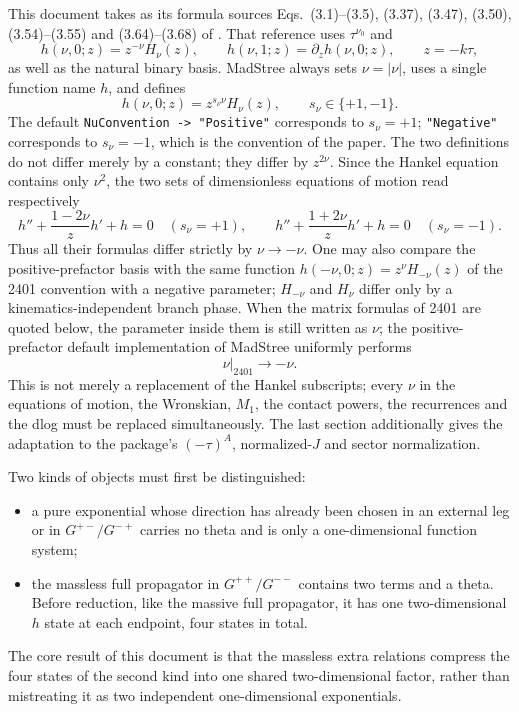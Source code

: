 \documentclass[11pt,a4paper]{article}
\begin{document}
This document takes as its formula sources Eqs.~(3.1)--(3.5), (3.37), (3.47), (3.50), (3.54)--(3.55) and (3.64)--(3.68) of \cite{Chen:2023eic}. That reference uses $\tau^{\nu_0}$ and
\begin{equation}
 h(\nu,0;z)=z^{-\nu}H_{\nu}(z),
 \qquad
 h(\nu,1;z)=\partial_z h(\nu,0;z),
 \qquad z=-k\tau,
 \label{eq:paper-h-definition}
\end{equation}
as well as the natural binary basis. MadStree always sets $\nu=|\nu|$, uses a single function name $h$, and defines
\begin{equation}
 \boxed{h(\nu,0;z)=z^{s_\nu\nu}H_\nu(z)},
 \qquad s_\nu\in\{+1,-1\}.
 \label{eq:positive-order-h}
\end{equation}
The default \texttt{NuConvention -> "Positive"} corresponds to $s_\nu=+1$; \texttt{"Negative"} corresponds to $s_\nu=-1$, which is the convention of the paper. The two definitions do not differ merely by a constant; they differ by $z^{2\nu}$. Since the Hankel equation contains only $\nu^2$, the two sets of dimensionless equations of motion read respectively
\begin{equation}
 h''+\frac{1-2\nu}{z}h'+h=0\quad(s_\nu=+1),
 \qquad
 h''+\frac{1+2\nu}{z}h'+h=0\quad(s_\nu=-1).
\end{equation}
Thus all their formulas differ strictly by $\nu\to-\nu$. One may also compare the positive-prefactor basis with the same function $h(-\nu,0;z)=z^\nu H_{-\nu}(z)$ of the 2401 convention with a negative parameter; $H_{-\nu}$ and $H_\nu$ differ only by a kinematics-independent branch phase. When the matrix formulas of 2401 are quoted below, the parameter inside them is still written as $\nu$; the positive-prefactor default implementation of MadStree uniformly performs
\begin{equation}
 \boxed{\left.\nu\right|_{2401}\longrightarrow-\nu}.
 \label{eq:paper-to-positive-order}
\end{equation}
This is not merely a replacement of the Hankel subscripts; every $\nu$ in the equations of motion, the Wronskian, $M_1$, the contact powers, the recurrences and the dlog must be replaced simultaneously. The last section additionally gives the adaptation to the package's $(-\tau)^A$, normalized-$J$ and sector normalization.

Two kinds of objects must first be distinguished:
\begin{itemize}
  \item a pure exponential whose direction has already been chosen in an external leg or in $G^{+-}/G^{-+}$ carries no theta and is only a one-dimensional function system;
  \item the massless full propagator in $G^{++}/G^{--}$ contains two terms and a theta. Before reduction, like the massive full propagator, it has one two-dimensional $h$ state at each endpoint, four states in total.
\end{itemize}
The core result of this document is that the massless extra relations compress the four states of the second kind into one shared two-dimensional factor, rather than mistreating it as two independent one-dimensional exponentials.
\end{document}
